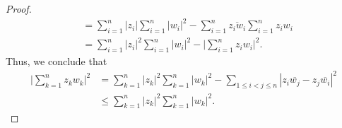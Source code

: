 \documentclass[a4paper]{article}
\begin{document}
\begin{proof}
\begin{align*}
                                                                                                                &=  \sum_{ i=1  }^{ n  }| {z}_{i} | \sum_{ i=1  }^{ n   } | {w}_{i} |^{2} - \sum_{ i=1  }^{ n }  \overline{{z}_{i} {w}_{i}} \sum_{ i=1  }^{ n } {z}_{i} {w}_{i} \tag{for \( i = j  \)} \\  
                                                                                                                &=  \sum_{ i=1  }^{ n } | {z}_{i} |^{2} \sum_{ i=1  }^{ n  } | {w}_{i} |^{2} - \Big| \sum_{ i=1  }^{ n } {z}_{i} {w}_{i}  \Big|^{2}.
        \end{align*}
        Thus, we conclude that 
        \begin{align*}   \Big| \sum_{ k=1  }^{ n } {z}_{k} {w}_{k} \Big|^{2} &= \sum_{ k=1  }^{ n } | {z}_{k} |^{2} \sum_{ k=1  }^{ n } | {w}_{k } |^{2} - \sum_{ 1 \leq i < j \leq n  }^{  } | {z}_{i} \overline{{w}_{j}} - {z}_{j} \overline{{w}_{i}} |^{2} \\  
            &\leq \sum_{ k=1  }^{ n } | {z}_{k } |^{2} \sum_{ k=1  }^{ n } | {w}_{k } |^{2}.  
        \end{align*}

        \end{proof}
\end{document}
